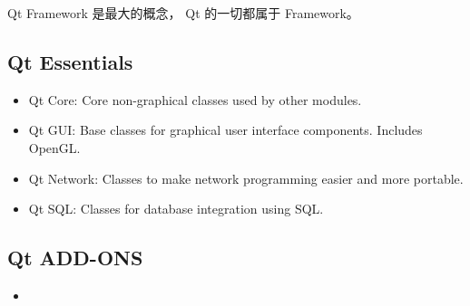 
\begin{issues}
\issueDraft
\end{issues}

Qt Framework 是最大的概念， Qt 的一切都属于 Framework。

\subsection{Qt Essentials}
\begin{itemize}
\item Qt Core: Core non-graphical classes used by other modules.
\item Qt GUI: Base classes for graphical user interface components. Includes OpenGL.
\item Qt Network: Classes to make network programming easier and more portable.
\item Qt SQL: Classes for database integration using SQL.
\end{itemize}

\subsection{Qt ADD-ONS}
\begin{itemize}
\item 
\end{itemize}
